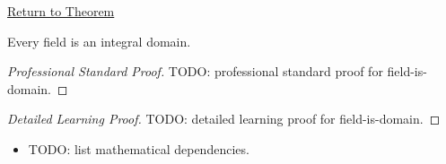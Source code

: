 \newpage
{}
\label{prf:field-is-domain}

\begin{remark*}[Return]
\hyperref[prop:field-is-domain]{Return to Theorem}
\end{remark*}

\begin{theorem*}
Every field is an integral domain.
\end{theorem*}

\begin{proof}[Professional Standard Proof]
\LRAProofBodyStart
TODO: professional standard proof for field-is-domain.
\end{proof}

\begin{proof}[Detailed Learning Proof]
\LRAProofBodyStart
TODO: detailed learning proof for field-is-domain.
\end{proof}

\begin{remark*}
\end{remark*}

\begin{dependencies}
\begin{itemize}
  \item TODO: list mathematical dependencies.
\end{itemize}
\end{dependencies}

\clearpage
